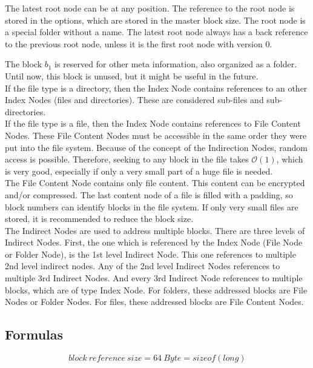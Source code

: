 \documentclass[JCDReport.tex]{subfiles}
\begin{document}
The latest root node can be at any position. The reference to the root node is stored in the options, which are stored in the master block size. The root node is a special folder without a name. The latest root node always has a back reference to the previous root node, unless it is the first root node with version 0.

The block $b_{1}$ is reserved for other meta information, also organized as a folder. Until now, this block is unused, but it might be useful in the future.\\

If the file type is a directory, then the Index Node contains references to an other Index Nodes (files and directories). These are considered sub-files and sub-directories.\\

If the file type is a file, then the Index Node contains references to File Content Nodes. These File Content Nodes must be accessible in the same order they were put into the file system. Because of the concept of the Indirection Nodes, random access is possible. Therefore, seeking to any block in the file takes $\mathcal{O}(1)$, which is very good, especially if only a very small part of a huge file is needed.\\

The File Content Node contains only file content. This content can be encrypted and/or compressed. The last content node of a file is filled with a padding, so block numbers can identify blocks in the file system. If only very small files are stored, it is recommended to reduce the block size.\\

The Indirect Nodes are used to address multiple blocks. There are three levels of Indirect Nodes. First, the one which is referenced by the Index Node (File Node or Folder Node), is the 1st level Indirect Node. This one references to multiple 2nd level indirect nodes. Any of the 2nd level Indirect Nodes references to multiple 3rd Indirect Nodes. And every 3rd Indirect Node references to multiple blocks, which are of type Index Node. For folders, these addressed blocks are File Nodes or Folder Nodes. For files, these addressed blocks are File Content Nodes.


\subsection{Formulas}

\begin{equation}
{block\ reference\ size} = {64\ Byte} = sizeof(long)
\end{equation}
\end{document}
